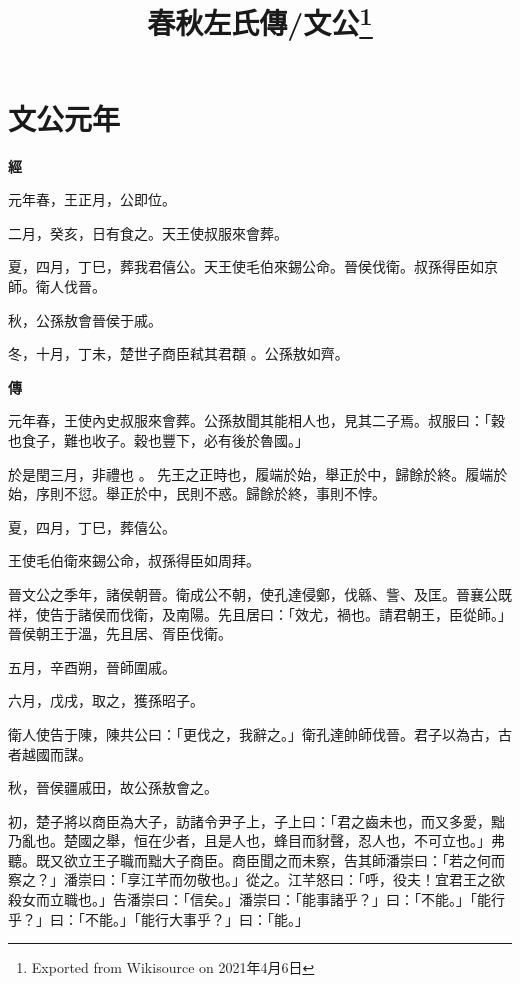 \documentclass{ctexart}
\title{春秋左氏傳/文公\footnote{Exported from Wikisource on 2021年4月6日}}
\begin{document}
\maketitle









\section{文公元年}





\textbf{經}



元年春，王正月，公即位。

二月，癸亥，日有食之。天王使叔服來會葬。

夏，四月，丁巳，葬我君僖公。天王使毛伯來錫公命。晉侯伐衛。叔孫得臣如京師。衛人伐晉。

秋，公孫敖會晉侯于戚。

冬，十月，丁未，楚世子商臣弒其君頵 。公孫敖如齊。

\textbf{傳}



元年春，王使內史叔服來會葬。公孫敖聞其能相人也，見其二子焉。叔服曰：「穀也食子，難也收子。穀也豐下，必有後於魯國。」

於是閏三月，非禮也 。
先王之正時也，履端於始，舉正於中，歸餘於終。履端於始，序則不愆。舉正於中，民則不惑。歸餘於終，事則不悖。

夏，四月，丁巳，葬僖公。

王使毛伯衛來錫公命，叔孫得臣如周拜。

晉文公之季年，諸侯朝晉。衛成公不朝，使孔達侵鄭，伐緜、訾、及匡。晉襄公既祥，使告于諸侯而伐衛，及南陽。先且居曰：「效尤，禍也。請君朝王，臣從師。」晉侯朝王于溫，先且居、胥臣伐衛。

五月，辛酉朔，晉師圍戚。

六月，戊戌，取之，獲孫昭子。

衛人使告于陳，陳共公曰：「更伐之，我辭之。」衛孔達帥師伐晉。君子以為古，古者越國而謀。

秋，晉侯疆戚田，故公孫敖會之。

初，楚子將以商臣為大子，訪諸令尹子上，子上曰：「君之齒未也，而又多愛，黜乃亂也。楚國之舉，恒在少者，且是人也，蜂目而豺聲，忍人也，不可立也。」弗聽。既又欲立王子職而黜大子商臣。商臣聞之而未察，告其師潘崇曰：「若之何而察之？」潘崇曰：「享江芊而勿敬也。」從之。江芊怒曰：「呼，役夫！宜君王之欲殺女而立職也。」告潘崇曰：「信矣。」潘崇曰：「能事諸乎？」曰：「不能。」「能行乎？」曰：「不能。」「能行大事乎？」曰：「能。」
\end{document}

